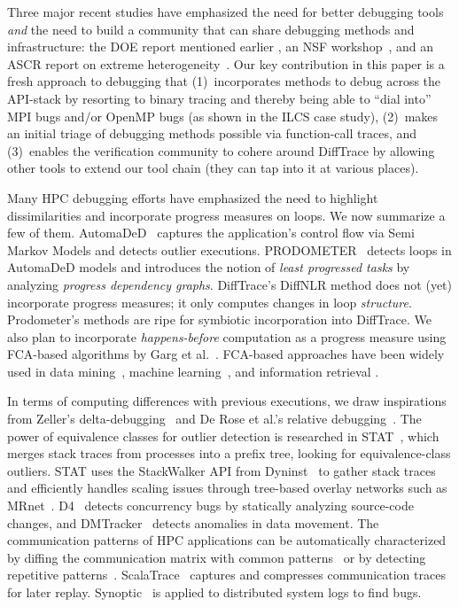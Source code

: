 Three major recent studies
have emphasized the need for better debugging tools
{\em and} the need to build a community that can share debugging
methods and infrastructure: the DOE report mentioned
earlier \cite{hpcdoe},
an NSF workshop~\cite{Cohen:2018:IRC:3297279}, and an ASCR report on
extreme heterogeneity~\cite{ascr-report-extreme-heterogeneity}.
%
Our key contribution in this paper is a fresh approach to debugging
that (1)~incorporates methods to debug across the API-stack
by resorting to binary tracing and thereby being able to ``dial into''
MPI bugs and/or OpenMP bugs (as shown in the ILCS case study), (2)~makes
an initial triage of debugging methods possible via function-call traces,
and (3)~enables the verification community to cohere around DiffTrace
by allowing other tools to extend our tool chain (they can tap into it at various places).


Many HPC debugging efforts have emphasized
the need to highlight dissimilarities and
incorporate progress measures on loops. We now
summarize a few of them.
%
AutomaDeD~\cite{automaded-GBron}\cite{automaded-laguna}
captures the application's control flow
via Semi Markov Models and detects outlier executions.
%
PRODOMETER~\cite{prodometer} detects loops in
AutomaDeD models and introduces the
notion of {\em least progressed tasks} by analyzing {\em progress dependency graphs}.
%
DiffTrace's DiffNLR method does not (yet) incorporate progress measures; it only
computes changes in loop {\em structure}.
%
Prodometer's methods are ripe for symbiotic incorporation into DiffTrace.
%
We also plan to incorporate {\em happens-before} computation as a progress measure using FCA-based algorithms by Garg et al.~\cite{latticeForDistConst,garg_2015}.
%
FCA-based approaches have been widely used in data mining~\cite{cldm},
machine learning~\cite{clml}, and information retrieval \cite{ignatov17}.


In terms of computing differences with previous executions,
we draw inspirations from
Zeller's delta-debugging~\cite{DBLP:conf/esec/Zeller99}
and De Rose et al.'s relative debugging~\cite{relative-debugging}.
%
The power of equivalence classes for outlier detection is
researched in STAT~\cite{stat}, which
merges stack traces from processes into a prefix tree,
looking for equivalence-class outliers.
%
STAT uses the StackWalker API from Dyninst~\cite{dyninst} to gather stack traces
and efficiently handles scaling issues
through tree-based overlay networks such as MRnet~\cite{mrnet}.
%
D4~\cite{liu-18} detects concurrency bugs by statically analyzing source-code
changes, and DMTracker~\cite{dmtracker} detects anomalies in data movement.
%
The communication patterns of HPC applications can be automatically characterized by
diffing the communication matrix with common patterns~\cite{roth-15} or by
detecting repetitive patterns~\cite{preissl-08}.
%
ScalaTrace~\cite{scalatrace} captures and compresses communication traces for later replay. 
%
Synoptic~\cite{beschastnikh-synoptic} is applied to distributed
system logs to find bugs.
%

